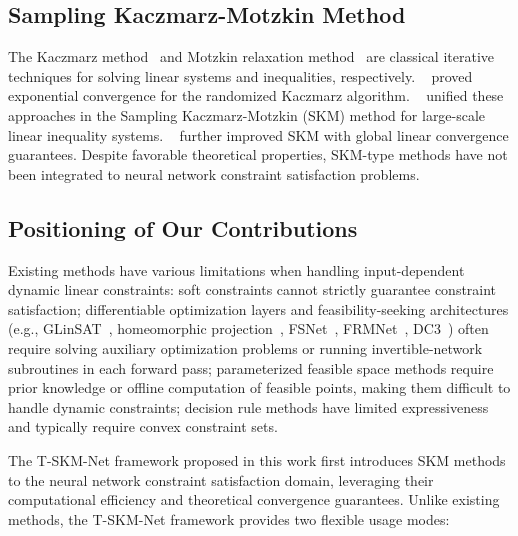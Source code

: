 \documentclass[letterpaper]{article} %
\begin{document}
\subsection{Sampling Kaczmarz-Motzkin Method} 

The Kaczmarz method~\cite{karczmarz1937angenaherte} and Motzkin relaxation method~\cite{motzkin1954relaxation} are classical iterative techniques for solving linear systems and inequalities, respectively. \citeauthor{strohmerRandomizedKaczmarzAlgorithm2009}~ proved exponential convergence for the randomized Kaczmarz algorithm. \citeauthor{loeraSamplingKaczmarzMotzkinAlgorithm2017}~ unified these approaches in the Sampling Kaczmarz-Motzkin (SKM) method for large-scale linear inequality systems. \citeauthor{morshedSamplingKaczmarzMotzkin2022}~ further improved SKM with global linear convergence guarantees. Despite favorable theoretical properties, SKM-type methods have not been integrated to neural network constraint satisfaction problems. 

\subsection{Positioning of Our Contributions} 

Existing methods have various limitations when handling input-dependent dynamic linear constraints: soft constraints cannot strictly guarantee constraint satisfaction; differentiable optimization layers and feasibility-seeking architectures (e.g., GLinSAT~\cite{zengGLinSATGeneralLinear2024}, homeomorphic projection~\cite{liang2023low}, FSNet~\cite{nguyen2025fsnet}, FRMNet~\cite{hanFRMNetFeasibilityRestoration2024a}, DC3~\cite{dontiDC3LearningMethod2021}) often require solving auxiliary optimization problems or running invertible-network subroutines in each forward pass; parameterized feasible space methods require prior knowledge or offline computation of feasible points, making them difficult to handle dynamic constraints; decision rule methods have limited expressiveness and typically require convex constraint sets.

The T-SKM-Net framework proposed in this work first introduces SKM methods to the neural network constraint satisfaction domain, leveraging their computational efficiency and theoretical convergence guarantees. Unlike existing methods, the T-SKM-Net framework provides two flexible usage modes:
\end{document}

